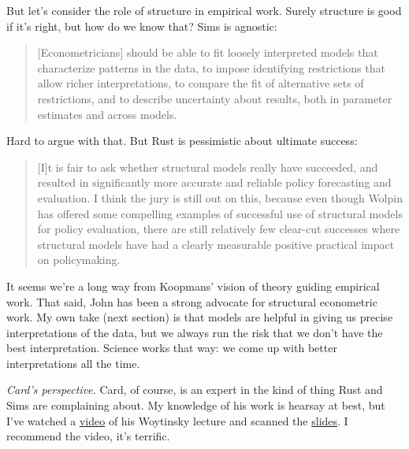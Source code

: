 \documentclass[11pt,letterpaper]{article}
\begin{document}
But let's consider the role of structure in empirical work.
Surely structure is good if it's right, but how do we know that?
Sims is agnostic:
\begin{quote}

[Econometricians] should be able to fit loosely interpreted models that characterize patterns
in the data, to impose identifying restrictions that allow richer interpretations, to
compare the fit of alternative sets of restrictions, and to describe uncertainty about
results, both in parameter estimates and across models.
\end{quote}
Hard to argue with that.
But Rust is pessimistic about ultimate success:
\begin{quote}
[I]t is fair to ask whether structural models really have succeeded,
and resulted in significantly more accurate and reliable policy forecasting
and evaluation.
I think the jury is still out on this, because even though Wolpin
has offered some compelling examples of successful use of structural models for policy evaluation, there are still relatively few
clear-cut successes where structural models have had a
clearly measurable positive practical impact on policymaking.
\end{quote}
It seems we're a long way from Koopmans' vision of theory guiding empirical work.
That said, John has been a strong advocate for structural econometric work.
My own take (next section) is that models are helpful in
giving us precise interpretations of the data,
but we always run the risk that we don't have the best interpretation.
Science works that way:  we come up with better interpretations all the time.


{\it Card's perspective.\/}
Card, of course, is an expert in the kind of thing Rust and Sims are complaining about.
My knowledge of his work is hearsay at best,
but I've watched a
\href{http://www.youtube.com/watch?v=S6xSEiB6E2s}{video}
of his Woytinsky lecture and scanned the
\href{http://davidcard.berkeley.edu/lectures/woytinsky.pdf}{slides}.
I recommend the video, it's terrific.
\end{document}
